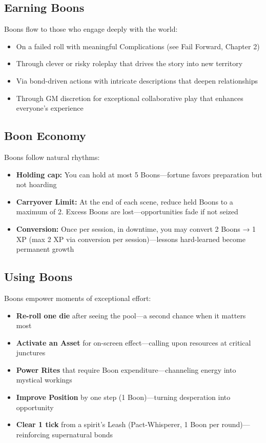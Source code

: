 \subsection*{Earning Boons}

Boons flow to those who engage deeply with the world:

\begin{itemize}
    \item On a failed roll with meaningful Complications (see Fail Forward, Chapter 2)
    \item Through clever or risky roleplay that drives the story into new territory
    \item Via bond-driven actions with intricate descriptions that deepen relationships
    \item Through GM discretion for exceptional collaborative play that enhances everyone's experience
\end{itemize}

\subsection*{Boon Economy}

Boons follow natural rhythms:

\begin{itemize}
    \item \textbf{Holding cap:} You can hold at most 5 Boons—fortune favors preparation but not hoarding
    \item \textbf{Carryover Limit:} At the end of each scene, reduce held Boons to a maximum of 2. Excess Boons are lost—opportunities fade if not seized
    \item \textbf{Conversion:} Once per session, in downtime, you may convert 2 Boons → 1 XP (max 2 XP via conversion per session)—lessons hard-learned become permanent growth
\end{itemize}

\subsection*{Using Boons}

Boons empower moments of exceptional effort:

\begin{itemize}
    \item \textbf{Re-roll one die} after seeing the pool—a second chance when it matters most
    \item \textbf{Activate an Asset} for on-screen effect—calling upon resources at critical junctures
    \item \textbf{Power Rites} that require Boon expenditure—channeling energy into mystical workings
    \item \textbf{Improve Position} by one step (1 Boon)—turning desperation into opportunity
    \item \textbf{Clear 1 tick} from a spirit's Leash (Pact-Whisperer, 1 Boon per round)—reinforcing supernatural bonds
\end{itemize}

